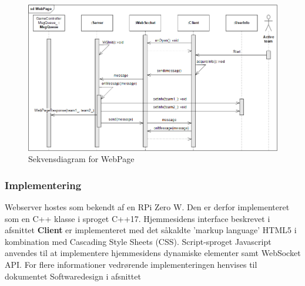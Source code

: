 \documentclass[Rapport/Rapport_main.tex]{subfiles}
\begin{document}
\begin{figure}[H]
    \centering
    \includegraphics[width=1\textwidth]{Softwaredesign/RPiApp/graphic_RPi/WebPage_sd_2.png}
    \caption{Sekvensdiagram for WebPage}
    \label{fig:WebPage_sequence_diagram}
\end{figure}
\subsubsection{Implementering}
Webserver hostes som bekendt af en RPi Zero W. Den er derfor implementeret som en C++ klasse i sproget C++17. Hjemmesidens interface beskrevet i afsnittet \textbf{Client} er implementeret med det såkaldte 'markup language' HTML5 i kombination med Cascading Style Sheets (CSS). Script-sproget Javascript anvendes til at implementere hjemmesidens dynamiske elementer samt WebSocket API. For flere informationer vedrørende implementeringen henvises til dokumentet Softwaredesign i afsnittet 
\end{document}

